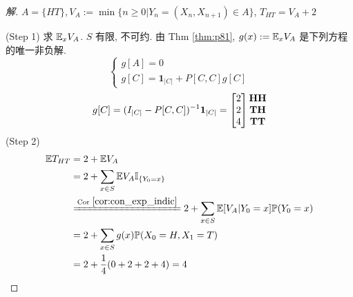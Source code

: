 \begin{proof}[解]
    $A=\{HT\}, V_A:=\min\{n\geq 0|Y_n=(X_n,X_{n+1})\in A\}$, $T_{HT}=V_A+2$
    
    (Step 1) 求 $\mathbb E_xV_A$. $S$ 有限, 不可约. 由 Thm \ref{thm:p81}, $g(x):=\mathbb E_xV_A$ 是下列方程的唯一非负解.
    \[
    \begin{cases}
        g[A]=0\\
        g[C]=\mathbf{1}_{|C|}+P[C,C]g[C]
    \end{cases}
    \]
    \[
    g[C]=(I_{|C|}-P[C,C])^{-1}\mathbf{1}_{|C|}=\begin{bmatrix}
        2\\2\\4
    \end{bmatrix}\begin{matrix}
        \bf HH \\ \bf TH\\ \bf TT
    \end{matrix}
    \]
    (Step 2)
    \[
    \begin{aligned}
        \EE T_{HT}&=2+\EE V_A\\
        &=2+\sum_{x\in S}\EE V_A\II_{\{Y_0=x\}}\\
        &\xlongequal{\text{Cor }\eqref{cor:con_exp_indic}}2+\sum_{x\in S}\EE[V_A|Y_0=x]\PP(Y_0=x)\\
        &=2+\sum_{x\in S}g(x)\PP(X_0=H,X_1=T)\\
        &=2+\frac{1}{4}(0+2+2+4)=4
    \end{aligned}
    \]
\end{proof}
\newpage